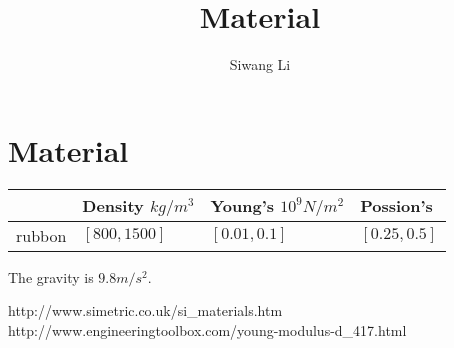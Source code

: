 \documentclass[9pt,twocolumn]{extarticle}
\author{Siwang Li}
\title{Material}
\begin{document}
\maketitle

\setlength{\parskip}{0.5ex}

\section{Material}
\begin{center}
  \begin{tabular}{ | l | l | l|l|}
    \hline
	&Density $kg/m^3$ & Young's $10^9N/m^2$ & Possion's  \\ \hline
	rubbon&$[800,1500]$& $[0.01,0.1]$ & $[0.25,0.5]$ \\ \hline
  \end{tabular}
\end{center}
The gravity is $9.8m/s^2$.

\begin{thebibliography}{99}
 http://www.simetric.co.uk/si\_materials.htm
 http://www.engineeringtoolbox.com/young-modulus-d\_417.html
\end{thebibliography}
\end{document}
